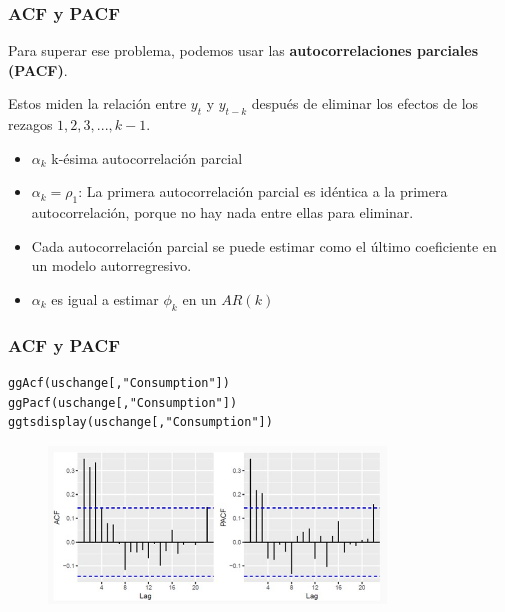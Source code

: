 \documentclass[10pt]{beamer}
\begin{document}
\begin{frame}[fragile]
\frametitle{ACF y PACF}


Para superar ese problema, podemos usar las \textbf{autocorrelaciones parciales (PACF)}.
\vspace{4mm}

Estos miden la relación entre $y_t$ y $y_{t-k}$ después de eliminar los efectos de los rezagos $1, 2, 3, ..., k-1$.

\vspace{4mm}

\begin{itemize}
\item $\alpha_k$ k-ésima autocorrelación parcial
\item $\alpha_k = \rho_1$: La primera autocorrelación parcial es idéntica a la primera autocorrelación, porque no hay nada entre ellas para eliminar.
\item Cada autocorrelación parcial se puede estimar como el último coeficiente en un modelo autorregresivo.
\item $\alpha_k$ es igual a estimar $\phi_k$ en un $AR(k)$
\end{itemize}


\end{frame}






\begin{frame}[fragile]
\frametitle{ACF y PACF}


\lstset{language=r,label= ,caption= ,captionpos=b,numbers=none}
\begin{lstlisting}
ggAcf(uschange[,"Consumption"])
ggPacf(uschange[,"Consumption"])
ggtsdisplay(uschange[,"Consumption"])
\end{lstlisting}

\pause


\begin{figure}
\begin{center}
    \includegraphics[width=0.8\textwidth]{Imagen14.JPG}
\end{center}
\end{figure}


\end{frame}
\end{document}

